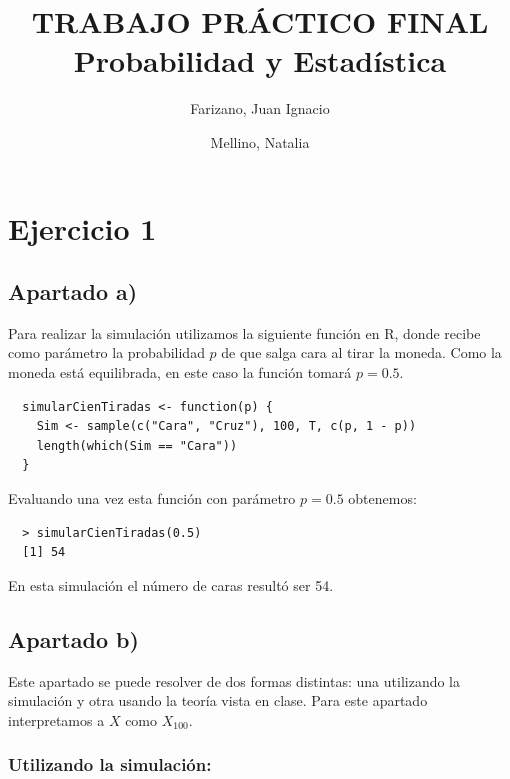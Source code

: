 \documentclass[11pt]{article}
\title{
  TRABAJO PRÁCTICO FINAL\\
  \large Probabilidad y Estadística
}
\author{
  Farizano, Juan Ignacio \\
  \and
  Mellino, Natalia
}
\date{}
\begin{document}
\maketitle
\newpage

\tableofcontents
\newpage


\section{Ejercicio 1}

\subsection*{Apartado a)}

Para realizar la simulación utilizamos la siguiente función en R, donde recibe 
como parámetro la probabilidad $ p $ de que salga cara al tirar la moneda. Como
la moneda está equilibrada, en este caso la función tomará $ p = 0.5 $.

\begin{verbatim}
  simularCienTiradas <- function(p) {
    Sim <- sample(c("Cara", "Cruz"), 100, T, c(p, 1 - p))
    length(which(Sim == "Cara"))
  }
\end{verbatim}

Evaluando una vez esta función con parámetro $ p = 0.5 $ obtenemos:

\begin{verbatim}
  > simularCienTiradas(0.5)
  [1] 54
\end{verbatim}

En esta simulación el número de caras resultó ser 54.


\subsection*{Apartado b)}

Este apartado se puede resolver de dos formas distintas: una utilizando
la simulación y otra usando la teoría vista en clase. Para este apartado
interpretamos a $ X $ como $ X_{100} $.

\subsubsection*{Utilizando la simulación:}
\end{document}
